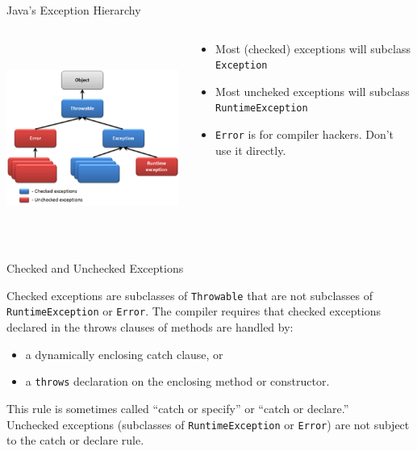 \documentclass{beamer}
\begin{document}
\begin{frame}[fragile]{Java's Exception Hierarchy}

\begin{columns}[t]
\begin{column}{2in}
\begin{center}
\includegraphics[height=2.5in]{hierarchy_of_java_exceptions.png}
\end{center}
\end{column}
\begin{column}{3in}
\begin{itemize}
\item Most (checked) exceptions will subclass {\tt Exception}
\item Most uncheked exceptions will subclass {\tt RuntimeException}
\item {\tt Error} is for compiler hackers.  Don't use it directly.
\end{itemize}
\end{column}
\end{columns}

\end{frame}



\begin{frame}[fragile]{Checked and Unchecked Exceptions}


Checked exceptions are subclasses of {\tt Throwable} that are not subclasses of {\tt RuntimeException} or {\tt Error}.  The compiler requires that checked exceptions declared in the throws clauses of methods are handled by:
\begin{itemize}
\item a dynamically enclosing catch clause, or
\item a {\tt throws} declaration on the enclosing method or constructor.
\end{itemize}
This rule is sometimes called ``catch or specify'' or ``catch or declare.''\\
\vspace{.1in}
Unchecked exceptions (subclasses of {\tt RuntimeException} or {\tt Error}) are not subject to the catch or declare rule.

\end{frame}
\end{document}

